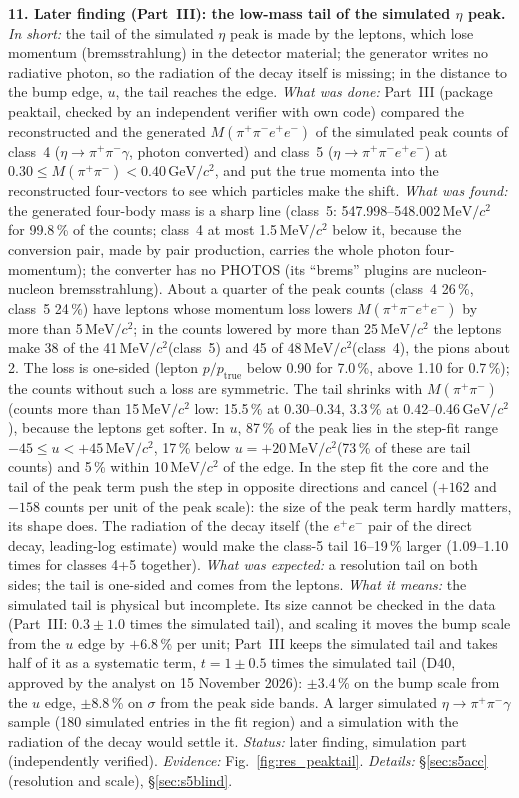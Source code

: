 \documentclass[11pt,a4paper]{article}
\newcommand{\ee}{\ensuremath{e^{+}e^{-}}\xspace}
\newcommand{\pipi}{\ensuremath{\pi^{+}\pi^{-}}\xspace}
\newcommand{\ppee}{\ensuremath{\pi^{+}\pi^{-}e^{+}e^{-}}\xspace}
\newcommand{\Mfour}{\ensuremath{M(\pi^{+}\pi^{-}e^{+}e^{-})}\xspace}
\newcommand{\Mpipi}{\ensuremath{M(\pi^{+}\pi^{-})}\xspace}
\newcommand{\GeVcc}{\ensuremath{\mathrm{GeV}/c^{2}}\xspace}
\newcommand{\MeVcc}{\ensuremath{\mathrm{MeV}/c^{2}}\xspace}
\begin{document}
\textbf{11. Later finding (Part~III): the low-mass tail of the simulated $\eta$ peak.} \emph{In short:} the tail of the
simulated $\eta$ peak is made by the leptons, which lose momentum (bremsstrahlung) in the detector material; the generator
writes no radiative photon, so the radiation of the decay itself is missing; in the distance to the bump edge, $u$, the tail
reaches the edge. \emph{What was done:} Part~III (package peaktail, checked by an independent verifier with own code)
compared the reconstructed and the generated \Mfour of the simulated peak counts of class~4 ($\eta\to\pipi\gamma$, photon
converted) and class~5 ($\eta\to\ppee$) at $0.30\le\Mpipi<0.40$\,\GeVcc, and put the true momenta into the reconstructed
four-vectors to see which particles make the shift. \emph{What was found:} the generated four-body mass is a sharp line
(class~5: 547.998--548.002\,\MeVcc for 99.8\,\% of the counts; class~4 at most 1.5\,\MeVcc below it, because the conversion
pair, made by pair production, carries the whole photon four-momentum); the converter has no PHOTOS (its ``brems'' plugins
are nucleon-nucleon bremsstrahlung). About a quarter of the peak counts (class~4 26\,\%, class~5 24\,\%) have leptons whose
momentum loss lowers \Mfour by more than 5\,\MeVcc; in the counts lowered by more than 25\,\MeVcc the leptons make 38 of the
41\,\MeVcc (class~5) and 45 of 48\,\MeVcc (class~4), the pions about 2. The loss is one-sided (lepton $p/p_{\mathrm{true}}$
below 0.90 for 7.0\,\%, above 1.10 for 0.7\,\%); the counts without such a loss are symmetric. The tail shrinks with \Mpipi
(counts more than 15\,\MeVcc low: 15.5\,\% at 0.30--0.34, 3.3\,\% at 0.42--0.46\,\GeVcc), because the leptons get softer. In
$u$, 87\,\% of the peak lies in the step-fit range $-45\le u<+45$\,\MeVcc, 17\,\% below $u=+20$\,\MeVcc (73\,\% of these are
tail counts) and 5\,\% within 10\,\MeVcc of the edge. In the step fit the core and the tail of the peak term push the step in
opposite directions and cancel ($+162$ and $-158$ counts per unit of the peak scale): the size of the peak term hardly matters,
its shape does. The radiation of the decay itself (the \ee pair of the direct decay, leading-log estimate) would make the
class-5 tail 16--19\,\% larger (1.09--1.10 times for classes 4+5 together). \emph{What was expected:} a resolution tail on
both sides; the tail is one-sided and comes from the leptons. \emph{What it means:} the simulated tail is physical but
incomplete. Its size cannot be checked in the data (Part~III: $0.3\pm1.0$ times the simulated tail), and scaling it moves the
bump scale from the $u$ edge by $+6.8$\,\% per unit; Part~III keeps the simulated tail and takes half of it as a systematic
term, $t=1\pm0.5$ times the simulated tail (D40, approved by the analyst on 15 November 2026): $\pm3.4$\,\% on the bump scale
from the $u$ edge, $\pm8.8$\,\% on $\sigma$ from the peak side bands. A larger simulated $\eta\to\pipi\gamma$ sample (180
simulated entries in the fit region) and a simulation
with the radiation of the decay would settle it. \emph{Status:} later finding, simulation part (independently verified).
\emph{Evidence:} Fig.~\ref{fig:res_peaktail}. \emph{Details:} \S\ref{sec:s5acc} (resolution and scale), \S\ref{sec:s5blind}.
\end{document}
